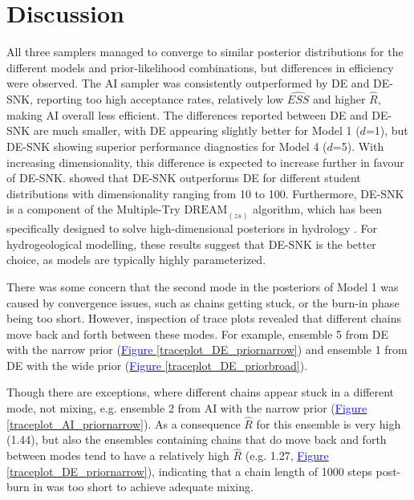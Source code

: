 \section{Discussion}\label{Discussion}
All three samplers managed to converge to similar posterior distributions for the different models and prior-likelihood combinations, but differences in efficiency were observed. The AI sampler was consistently outperformed by DE and DE-SNK, reporting too high acceptance rates, relatively low $\widehat{ESS}$ and higher $\hat{R}$, making AI overall less efficient. The differences reported between DE and DE-SNK are much smaller, with DE appearing slightly better for Model 1 ($d$=1), but DE-SNK showing superior performance diagnostics for Model 4 ($d$=5). With increasing dimensionality, this difference is expected to increase further in favour of DE-SNK. \cite{terbraak2008differential} showed that DE-SNK outperforms DE for different student distributions with dimensionality ranging from 10 to 100. Furthermore, DE-SNK is a component of the $\text{Multiple-Try DREAM}_{(zs)}$ algorithm, which has been specifically designed to solve high-dimensional posteriors in hydrology \citep{laloy2012high}. For hydrogeological modelling, these results suggest that DE-SNK is the better choice, as models are typically highly parameterized. 

There was some concern that the second mode in the posteriors of Model 1 was caused by convergence issues, such as chains getting stuck, or the burn-in phase being too short. However, inspection of trace plots revealed that different chains move back and forth between these modes. For example, ensemble 5 from DE with the narrow prior (\hyperref[traceplot_DE_priornarrow]{\textcolor{blue}{Figure }\ref{traceplot_DE_priornarrow}}) and ensemble 1 from DE with the wide prior (\hyperref[traceplot_DE_priorbroad]{\textcolor{blue}{Figure }\ref{traceplot_DE_priorbroad}}).  

Though there are exceptions, where different chains appear stuck in a different mode, not mixing, e.g. ensemble 2 from AI with the narrow prior (\hyperref[traceplot_AI_priornarrow]{\textcolor{blue}{Figure }\ref{traceplot_AI_priornarrow}}). As a consequence $\hat{R}$ for this ensemble is very high (1.44), but also the ensembles containing chains that do move back and forth between modes tend to have a relatively high $\hat{R}$ (e.g. 1.27, \hyperref[traceplot_DE_priornarrow]{\textcolor{blue}{Figure }\ref{traceplot_DE_priornarrow}}), indicating that a chain length of 1000 steps post-burn in was too short to achieve adequate mixing. %

